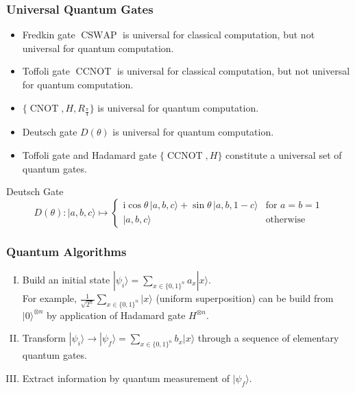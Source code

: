 \documentclass[UTF8,11pt,colorlinks,compress,openany]{beamer}%
\begin{document}
\begin{frame}\frametitle{Universal Quantum Gates}
	\begin{itemize}
		\item Fredkin gate $\operatorname{CSWAP}$ is universal for classical computation, but not universal for quantum computation.
		\item Toffoli gate $\operatorname{CCNOT}$ is universal for classical computation, but not universal for quantum computation.
		\item $\{\operatorname{CNOT},H,R_{\frac{\pi}{4}}\}$ is universal for quantum computation.
		\item Deutsch gate $D(\theta)$ is universal for quantum computation.
		\item Toffoli gate and Hadamard gate $\{\operatorname{CCNOT},H\}$ constitute a universal set of quantum gates.
	\end{itemize}
	\begin{block}{Deutsch Gate}
		\[D(\theta) : |a,b,c\rangle \mapsto \begin{cases} \mathrm{i}\cos\theta\,|a,b,c\rangle + \sin\theta\,|a,b,1-c\rangle & \mbox{for } a=b=1\\
		|a,b,c\rangle & \mbox{otherwise} \end{cases}\]
	\end{block}
\end{frame}

\begin{frame}\frametitle{Quantum Algorithms}
	\begin{enumerate}[I.]
		\item Build an initial state $|\psi_i\rangle=\sum\limits_{x\in\{0,1\}^n}a_x|x\rangle$.\\
		For example, $\frac{1}{\sqrt{2^n}}\sum\limits_{x\in\{0,1\}^n}|x\rangle$ (uniform superposition) can be build from $|0\rangle^{\otimes n}$ by application of Hadamard gate $H^{\otimes n}$.
		\item Transform $|\psi_i\rangle\to|\psi_f\rangle = \sum\limits_{x\in\{0,1\}^n} b_x|x\rangle$ through a sequence of elementary quantum gates.
		\item Extract information by quantum measurement of $|\psi_f\rangle$.
	\end{enumerate}
\end{frame}
\end{document}
